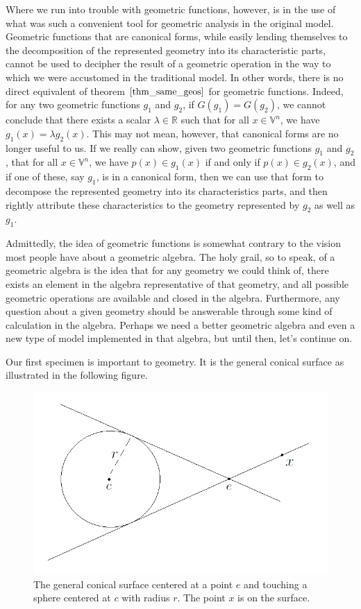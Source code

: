 \documentclass[12pt]{article}
\newcommand{\V}{\mathbb{V}}
\newcommand{\R}{\mathbb{R}}
\begin{document}
Where we run into trouble with geometric functions, however, is in the
use of what was such a convenient tool for geometric analysis
in the original model.  Geometric functions that are
canonical forms, while easily lending themselves to the decomposition
of the represented geometry into its characteristic parts, cannot
be used to decipher the result of a geometric operation in the way
to which we were accustomed in the traditional model.
In other words, there is no direct equivalent
of theorem $\eqref{thm_same_geos}$ for geometric functions.
Indeed, for any two geometric functions $g_1$ and $g_2$, if $G(g_1)=G(g_2)$,
we cannot conclude that there exists a scalar $\lambda\in\R$ such that for all
$x\in\V^n$, we have $g_1(x)=\lambda g_2(x)$.
This may not mean, however, that canonical forms are no longer useful to us.
If we really can show, given two geometric functions $g_1$ and $g_2$,
that for all $x\in\V^n$, we have $p(x)\in g_1(x)$ if and only if $p(x)\in g_2(x)$,
and if one of these, say $g_1$, is in a canonical form, then we can use that form to decompose
the represented geometry into its characteristics parts, and then rightly attribute these
characteristics to the geometry represented by $g_2$ as well as $g_1$.

Admittedly, the idea of geometric functions is somewhat contrary to the vision most people have about
a geometric algebra.  The holy grail, so to speak, of a geometric algebra
is the idea that for any geometry we could think of, there exists an element
in the algebra representative of that geometry, and all possible geometric
operations are available and closed in the algebra.  Furthermore, any question
about a given geometry should be answerable through some kind of calculation
in the algebra.  Perhaps we need a better geometric algebra
and even a new type of model implemented in that algebra, but until then,
let's continue on.

Our first specimen is important to geometry.
It is the general conical surface as illustrated in the following figure.
\begin{figure}[H]
\centering
\includegraphics[scale=0.4]{GeneralConicalSurfaceFigure}
\caption{The general conical surface centered at a point $e$ and touching a sphere centered at $c$ with radius $r$.
The point $x$ is on the surface.}
\end{figure}
\end{document}
